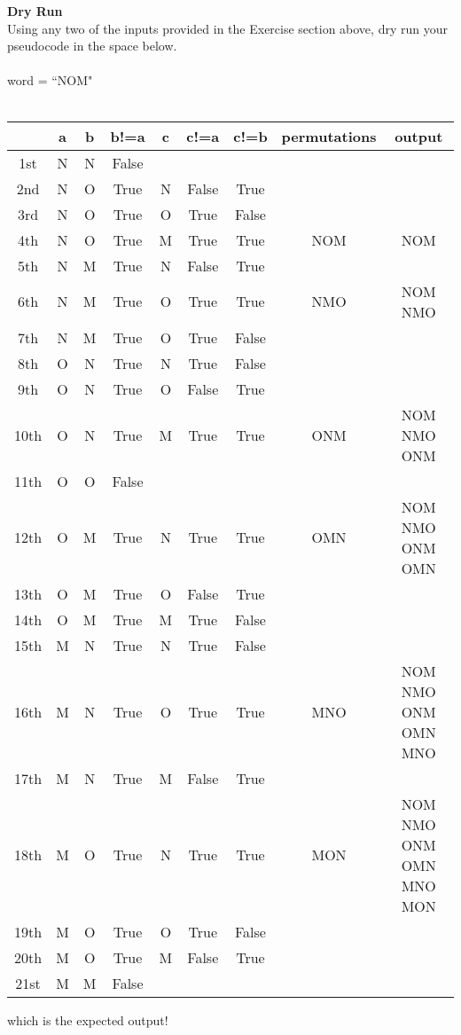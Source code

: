 \documentclass[a4paper]{exam}
\newcommand\heading[1]{\textbf{#1}}
\begin{document}
\begin{questions}
\begin{python}
  \end{python}
  \heading{Dry Run}\\
  Using any two of the inputs provided in the Exercise section above, dry run your pseudocode in the space below. \\ \\
  word = ``NOM" \\ \\
    \begin{tabular}{|c|c|c|c|c|c|c|c|c|}
        \hline
        \textbf{} & \textbf{a} & \textbf{b} & \textbf{b!=a} & \textbf{c} & \textbf{c!=a} & \textbf{c!=b} & \textbf{permutations} & \textbf{output} \\
        \hline
        1st & N & N & False & & & & \\
        \hline
        2nd & N & O & True & N & False & True \\
        \hline
        3rd & N & O & True & O & True & False & \\
        \hline
        4th & N & O & True & M & True & True & NOM & NOM \\
        \hline
        5th & N & M & True & N & False & True &  \\
        \hline
        6th & N & M & True & O & True & True & NMO & NOM NMO  \\
        \hline
        7th & N & M & True & O & True & False &  &  \\
        \hline
        8th & O & N & True & N & True & False &  \\
        \hline
        9th & O & N & True & O & False & True &   \\
        \hline
        10th & O & N & True & M & True & True & ONM & NOM NMO ONM \\
        \hline
        11th & O & O & False & & & & \\
        \hline
        12th & O & M & True & N & True & True & OMN & NOM NMO ONM OMN\\
        \hline
        13th & O & M & True & O & False & True & \\
        \hline
        14th & O & M & True & M & True & False & \\
        \hline
        15th & M & N & True & N & True & False & \\
        \hline
        16th & M & N & True & O & True & True & MNO & NOM NMO ONM OMN MNO \\
        \hline
        17th & M & N& True& M& False & True & \\
        \hline
        18th & M& O& True &N & True & True &MON& NOM NMO ONM OMN MNO MON\\
        \hline
        19th & M & O & True & O & True& False & \\
        \hline
        20th & M & O & True & M & False & True & \\
        \hline
        21st & M&M &False & & & & \\
        \hline
    \end{tabular}
 which is the expected output!


\end{questions}
\end{document}
